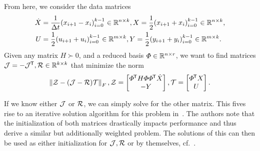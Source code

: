 From here, we consider the data matrices
\begin{align*}
    \dot{X} &= \frac{1}{\Delta t} {\left( x_{i + 1} - x_i \right)}_{i = 0}^{k - 1} \in \bb{R}^{n \times k}, X = \frac{1}{2} {\left( x_{i + 1} + x_i \right)}_{i = 0}^{k - 1} \in \bb{R}^{n \times k}, \\
    U &= \frac{1}{2} {\left( u_{i + 1} + u_i \right)}_{i = 0}^{k - 1} \in \bb{R}^{m \times k}, Y = \frac{1}{2} {\left( y_{i + 1} + y_i \right)}_{i = 0}^{k - 1} \in \bb{R}^{m \times k}. \\
\end{align*}
Given any matrix $H \succ 0$, and a reduced basis $\varPhi \in \bb{R}^{n \times r}$, we want to find matrices $\mcl{J} = -\mcl{J}\trans, \mcl{R} \in \bb{R}^{k \times k}$ that minimize the norm
\begin{equation}\label{eq:phdmd-lst-problem}
    \norm[F]{\mcl{Z} - (\mcl{J} - \mcl{R})\mcl{T}},
    \mcl{Z} =
    \begin{bmatrix}
        \varPhi\trans H \varPhi \varPhi\trans \dot{X} \\
        - Y
    \end{bmatrix},
    \mcl{T} =
    \begin{bmatrix}
        \varPhi\trans X \\
        U
    \end{bmatrix}.
\end{equation}

If we know either $\mcl{J}$ or $\mcl{R}$, we can simply solve for the other matrix.
This fives rise to an iterative solution algorithm for this problem in~\cite[Section~3.2]{Morandin2022}.
The authors note that the initialization of both matrices drastically impacts performance and thus derive a similar but additionally weighted problem.
The solutions of this can then be used as either initialization for $\mcl{J}, \mcl{R}$ or by themselves, cf.~\cite[Section~3.4]{Morandin2022}.